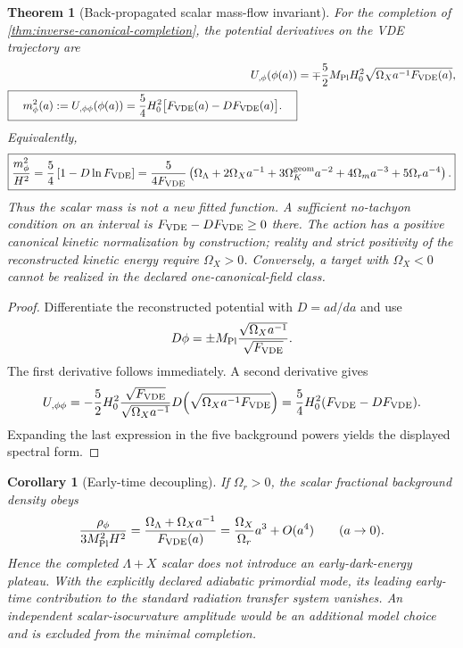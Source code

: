 \documentclass[11pt,a4paper]{article}
\def\dd{d}%
\def\Dil{D}%
\numberwithin{equation}{section}
\theoremstyle{definition}
\theoremstyle{plain}
\newtheorem{theorem}[criterion]{Theorem}
\newtheorem{corollary}[criterion]{Corollary}
\theoremstyle{remark}
\newcommand{\Dil}{\mathscr{D}}
\newcommand{\dd}{\mathrm{d}}
\begin{document}
\begin{theorem}[Back-propagated scalar mass-flow invariant]
\label{thm:mass-flow}
For the completion of \cref{thm:inverse-canonical-completion}, the potential
derivatives on the VDE trajectory are
\begin{align}
U_{,\phi}(\phi(a))
&=\mp\frac52M_{\rm Pl}H_0^2
\sqrt{\Omega_Xa^{-1}F_{\rm VDE}(a)},\\
\boxed{\quad
m_\phi^2(a):=U_{,\phi\phi}(\phi(a))
=\frac54H_0^2\bigl[F_{\rm VDE}(a)-\Dil F_{\rm VDE}(a)\bigr].\quad}
\end{align}
Equivalently,
\begin{equation}
\boxed{
\frac{m_\phi^2}{H^2}
=\frac54\left[1-\Dil\ln F_{\rm VDE}\right]
=\frac{5}{4F_{\rm VDE}}\left(
\Omega_\Lambda+2\Omega_Xa^{-1}+3\Omega_K^{\rm geom}a^{-2}
+4\Omega_ma^{-3}+5\Omega_ra^{-4}
\right).}
\end{equation}
Thus the scalar mass is not a new fitted function.  A sufficient no-tachyon
condition on an interval is $F_{\rm VDE}-\Dil F_{\rm VDE}\ge0$ there.  The action has a positive
canonical kinetic normalization by construction; reality and strict positivity
of the reconstructed kinetic energy require $\Omega_X>0$.  Conversely, a
target with $\Omega_X<0$ cannot be realized in the declared one-canonical-field
class.
\end{theorem}

\begin{proof}
Differentiate the reconstructed potential with $\Dil=a\dd/\dd a$ and use
\begin{equation}
\Dil\phi=\pm M_{\rm Pl}\frac{\sqrt{\Omega_Xa^{-1}}}{\sqrt{F_{\rm VDE}}}.
\end{equation}
The first derivative follows immediately.  A second derivative gives
\begin{equation}
U_{,\phi\phi}
=-\frac52H_0^2\frac{\sqrt{F_{\rm VDE}}}{\sqrt{\Omega_Xa^{-1}}}
\Dil\!\left(\sqrt{\Omega_Xa^{-1}F_{\rm VDE}}\right)
=\frac54H_0^2(F_{\rm VDE}-\Dil F_{\rm VDE}).
\end{equation}
Expanding the last expression in the five background powers yields the
displayed spectral form.
\end{proof}

\begin{corollary}[Early-time decoupling]
\label{cor:early-decoupling}
If $\Omega_r>0$, the scalar fractional background density obeys
\begin{equation}
\frac{\rho_\phi}{3M_{\rm Pl}^2H^2}
=\frac{\Omega_\Lambda+\Omega_Xa^{-1}}{F_{\rm VDE}(a)}
=\frac{\Omega_X}{\Omega_r}a^3+O(a^4)
\qquad(a\to0).
\end{equation}
Hence the completed $\Lambda+X$ scalar does not introduce an early-dark-energy
plateau.  With the explicitly declared adiabatic primordial mode, its leading
early-time contribution to the standard radiation transfer system vanishes.
An independent scalar-isocurvature amplitude would be an additional model
choice and is excluded from the minimal completion.
\end{corollary}
\end{document}
